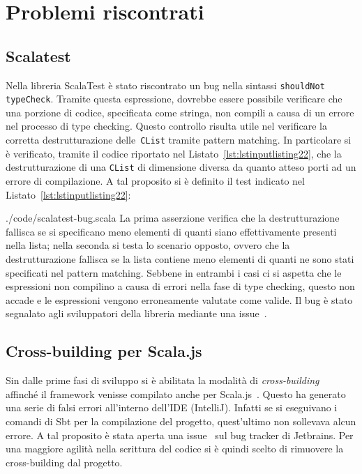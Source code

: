 \section{Problemi riscontrati}\label{sec:problemi-riscontrati}

\subsection{Scalatest}\label{subsec:scalatest}
Nella libreria ScalaTest è stato riscontrato un bug nella sintassi \texttt{shouldNot typeCheck}.
Tramite questa espressione, dovrebbe essere possibile verificare che una porzione di codice, specificata come stringa,
non compili a causa di un errore nel processo di type checking.
Questo controllo risulta utile nel verificare la corretta destrutturazione delle~\texttt{CList} tramite
pattern matching.
In particolare si è verificato, tramite il codice riportato nel Listato~\ref{lst:lstinputlisting22}, che la
destrutturazione di una \texttt{CList} di dimensione diversa da quanto atteso porti ad un errore di compilazione.
A tal proposito si è definito il test indicato nel Listato~\ref{lst:lstinputlisting22}:

{./code/scalatest-bug.scala}
La prima asserzione verifica che la destrutturazione fallisca se si specificano meno elementi di quanti siano
effettivamente presenti nella lista;
nella seconda si testa lo scenario opposto, ovvero che la destrutturazione fallisca se la lista contiene meno elementi
di quanti ne sono stati specificati nel pattern matching.
Sebbene in entrambi i casi ci si aspetta che le espressioni non compilino a causa di errori nella fase di
type checking, questo non accade e le espressioni vengono erroneamente valutate come valide.
Il bug è stato segnalato agli sviluppatori della libreria mediante una issue~\cite{scalatest-bug}.

\subsection{Cross-building per Scala.js}\label{subsec:cross-building-per-scala.js}
Sin dalle prime fasi di sviluppo si è abilitata la modalità di \textit{cross-building}~\cite{cross-building} affinché il
framework venisse compilato anche per Scala.js~\cite{scalajs}.
Questo ha generato una serie di falsi errori all'interno dell'IDE (IntelliJ).
Infatti se si eseguivano i comandi di Sbt per la compilazione del progetto, quest'ultimo non sollevava alcun errore.
A tal proposito è stata aperta una issue~\cite{intellij-issue} sul bug tracker di Jetbrains.
Per una maggiore agilità nella scrittura del codice si è quindi scelto di rimuovere la cross-building dal progetto.

